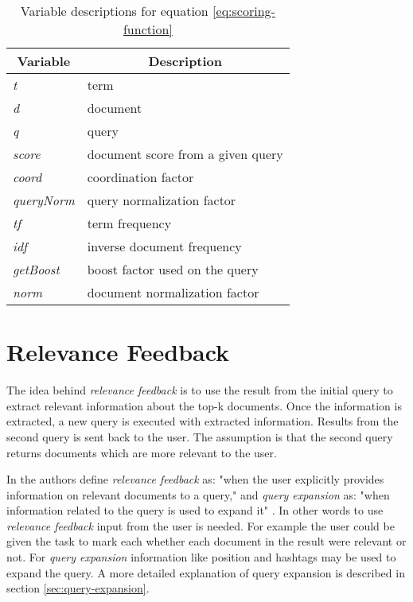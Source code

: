 \begin{table}
		\centering
    \begin{tabular}{|l|l|}
    \hline
		\multicolumn{1}{|c|}{\bfseries Variable} & \multicolumn{1}{c|}{\bfseries Description} \\ \hline
    \textit{t}         & term                           		\\ \hline
    \textit{d}         & document                       		\\ \hline
    \textit{q}         & query                          		\\ \hline
		\textit{score}     & document score from a given query	\\ \hline
    \textit{coord}     & coordination factor            		\\ \hline
    \textit{queryNorm} & query normalization factor     		\\ \hline
    \textit{tf}        & term frequency                 		\\ \hline
    \textit{idf}       & inverse document frequency     		\\ \hline
    \textit{getBoost}  & boost factor used on the query 		\\ \hline
    \textit{norm}      & document normalization factor  		\\ \hline
    \end{tabular}
		\caption{Variable descriptions for equation \ref{eq:scoring-function}}
		\label{tbl:scoring-function}
\end{table}

\section{Relevance Feedback}
The idea behind \textit{relevance feedback} is to use the result from the initial query to extract relevant information about the top-k documents.
Once the information is extracted, a new query is executed with extracted information.
Results from the second query is sent back to the user.
The assumption is that the second query returns documents which are more relevant to the user.

In \cite{ir-book} the authors define \textit{relevance feedback} as: "when the user explicitly provides information on relevant documents to a query,"
and \textit{query expansion} as: "when information related to the query is used to expand it" \cite[p. 177]{ir-book}.
In other words to use \textit{relevance feedback} input from the user is needed.
For example the user could be given the task to mark each whether each document in the result were relevant or not.
For \textit{query expansion} information like position and hashtags may be used to expand the query.
A more detailed explanation of query expansion is described in section \ref{sec:query-expansion}.

